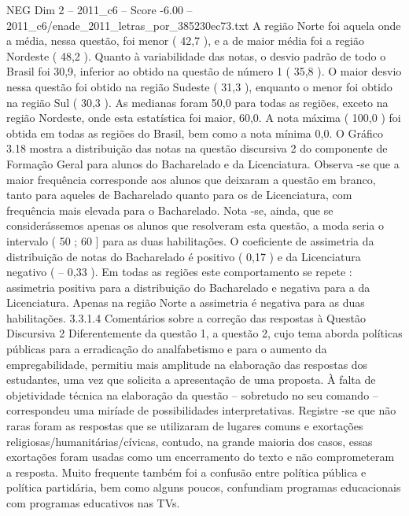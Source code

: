 \begin{textsample}{NEG Dim 2 – 2011\_c6 – Score -6.00 – 2011\_c6/enade\_2011\_letras\_por\_385230ec73.txt}
A região Norte foi aquela onde a média, nessa questão, foi menor ( 42,7 ), e a de maior média foi a região Nordeste ( 48,2 ).
Quanto à variabilidade das notas, o desvio padrão de todo o Brasil foi 30,9, inferior ao obtido na questão de número 1 ( 35,8 ).
O maior desvio nessa questão foi obtido na região Sudeste ( 31,3 ), enquanto o menor foi obtido na região Sul ( 30,3 ).
As medianas foram 50,0 para todas as regiões, exceto na região Nordeste, onde esta estatística foi maior, 60,0.
A nota máxima ( 100,0 ) foi obtida em todas as regiões do Brasil, bem como a nota mínima 0,0.
O Gráfico 3.18 mostra a distribuição das notas na questão discursiva 2 do componente de Formação Geral para alunos do Bacharelado e da Licenciatura.
Observa -se que a maior frequência corresponde aos alunos que deixaram a questão em branco, tanto para aqueles de Bacharelado quanto para os de Licenciatura, com frequência mais elevada para o Bacharelado.
Nota -se, ainda, que se considerássemos apenas os alunos que resolveram esta questão, a moda seria o intervalo ( 50 ; 60 ] para as duas habilitações.
O coeficiente de assimetria da distribuição de notas do Bacharelado é positivo ( 0,17 ) e da Licenciatura negativo ( – 0,33 ).
Em todas as regiões este comportamento se repete : assimetria positiva para a distribuição do Bacharelado e negativa para a da Licenciatura.
Apenas na região Norte a assimetria é negativa para as duas habilitações. 3.3.1.4 Comentários sobre a correção das respostas à Questão Discursiva 2 Diferentemente da questão 1, a questão 2, cujo tema aborda políticas públicas para a erradicação do analfabetismo e para o aumento da empregabilidade, permitiu mais amplitude na elaboração das respostas dos estudantes, uma vez que solicita a apresentação de uma proposta.
À falta de objetividade técnica na elaboração da questão – sobretudo no seu comando – correspondeu uma miríade de possibilidades interpretativas.
Registre -se que não raras foram as respostas que se utilizaram de lugares comuns e exortações religiosas/humanitárias/cívicas, contudo, na grande maioria dos casos, essas exortações foram usadas como um encerramento do texto e não comprometeram a resposta.
Muito frequente também foi a confusão entre política pública e política partidária, bem como alguns poucos, confundiam programas educacionais com programas educativos nas TVs.

\end{textsample}
